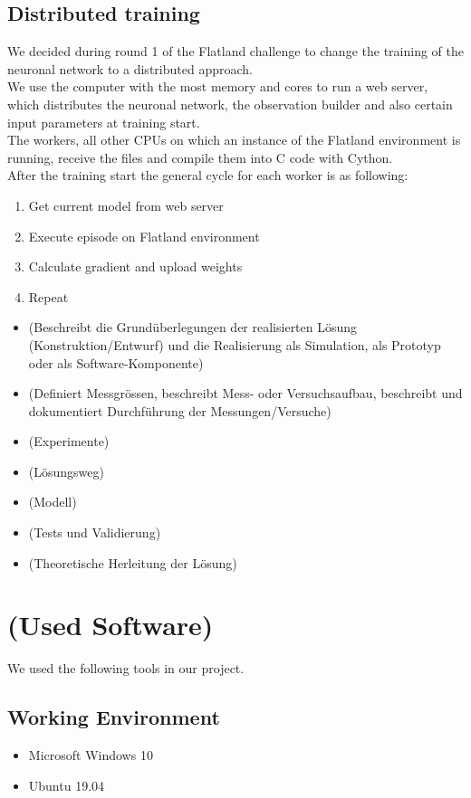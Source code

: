 \subsection*{Distributed training}
We decided during round 1 of the Flatland challenge to change the training of the neuronal network to a distributed approach. \\
We use the computer with the most memory and cores to run a web server, which distributes the neuronal network, the observation builder and also certain input parameters at training start. \\
The workers, all other CPUs on which an instance of the Flatland environment is running, receive the files and compile them into C code with Cython.\\
After the training start the general cycle for each worker is as following:

\begin{enumerate}
	\item Get current model from web server
	\item Execute episode on Flatland environment
	\item Calculate gradient and upload weights
	\item Repeat
\end{enumerate}





\begin{itemize}
\item (Beschreibt die Grundüberlegungen der realisierten Lösung (Konstruktion/Entwurf) und die Realisierung als Simulation, als Prototyp oder als Software-Komponente)
\item (Definiert Messgrössen, beschreibt Mess- oder Versuchsaufbau, beschreibt und dokumentiert Durchführung der Messungen/Versuche)
\item (Experimente)
\item (Lösungsweg)
\item (Modell)
\item (Tests und Validierung)
\item (Theoretische Herleitung der Lösung)
\end{itemize}

\section{(Used Software)}\label{software}
We used the following tools in our project.

\subsection*{Working Environment}\label{os}
\begin{itemize}
	\item Microsoft Windows 10
	\item Ubuntu 19.04
\end{itemize}

